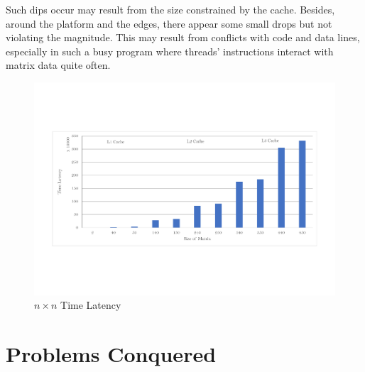 \documentclass[12pt,a4paper]{article}
\begin{document}
Such dips occur may result from the size constrained by the cache. Besides, around the platform and the edges, there appear some small drops but not violating the magnitude. This may result from conflicts with code and data lines, especially in such a busy program where threads' instructions interact with matrix data quite often.

\begin{figure}[H]
	\centering
	\includegraphics[scale= 0.6]{./fig/n_thread_chart.pdf}
	\caption{$n\times n $ Time Latency}
	\label{fig::n x n threads time latency}
\end{figure}


\section{Problems Conquered}
\end{document}
